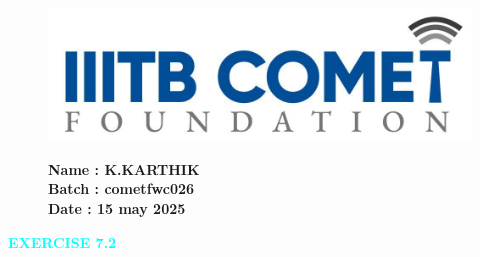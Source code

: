 \documentclass[a4paper,12pt]{article}
\begin{document}
                                                                   \begin{figure}[h!]
    \begin{minipage}{0.45\textwidth}  %
        \includegraphics[width=\textwidth]{sun.png}  %

    \end{minipage} \hfill
    \begin{minipage}{0.45\textwidth}  %
        \textbf{Name : K.KARTHIK} \\
    \textbf{Batch : cometfwc026} \\
  \textbf{Date : 15 may 2025}
    \end{minipage}
\end{figure}
\begin{center}
  \textcolor{cyan}{\textbf{\Large EXERCISE 7.2}}
\end{center}
\end{document}
